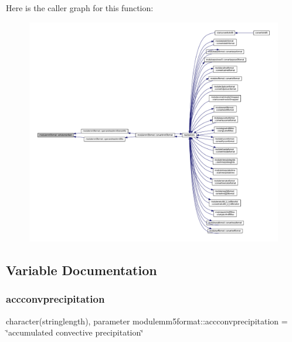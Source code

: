 Here is the caller graph for this function\+:\nopagebreak
\begin{figure}[H]
\begin{center}
\leavevmode
\includegraphics[width=350pt]{namespacemodulemm5format_a5e2ead0b671ea8295a54332e57b9f3c0_icgraph}
\end{center}
\end{figure}


\subsection{Variable Documentation}
\mbox{\label{namespacemodulemm5format_a101bf0aa4a9ab5456ed7d19dc05bd796}} 
\subsubsection{\texorpdfstring{accconvprecipitation}{accconvprecipitation}}
{\footnotesize\ttfamily character(stringlength), parameter modulemm5format\+::accconvprecipitation = \char`\"{}accumulated convective precipitation\char`\"{}\hspace{0.3cm}{\ttfamily [private]}}

\mbox{\label{namespacemodulemm5format_ad160a358d9d8a90c1e91557493fd9482}} 
